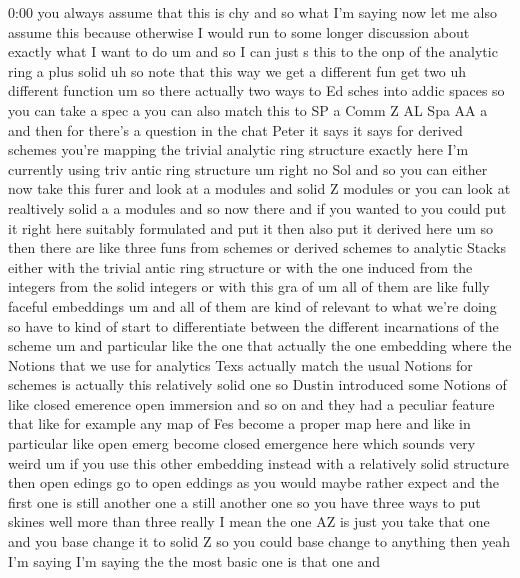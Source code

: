 \begin{unfinished}{0:00}
you  always  assume  that  this  is  chy  and
so  what  I'm  saying  now  let  me  also
assume  this  because  otherwise  I  would
run  to  some  longer  discussion  about
exactly  what  I  want  to  do
um  and  so  I  can  just  s  this  to  the  onp
of  the  analytic  ring  a  plus
solid  uh  so
note  that  this  way  we  get  a  different
fun
get  two  uh
different
function  um  so  there  actually  two  ways
to  Ed  sches  into  addic
spaces  so  you  can  take  a  spec
a  you  can  also  match  this  to
SP  a  Comm  Z  AL  Spa  AA
a  and  then  for  there's  a  question  in  the
chat  Peter  it  says  it  says  for  derived
schemes  you're  mapping  the  trivial
analytic  ring  structure  exactly  here  I'm
currently  using  triv  antic  ring
structure
um  right  no
Sol  and  so  you  can  either  now  take  this
furer  and  look  at  a  modules  and  solid  Z
modules  or  you  can  look  at  realtively
solid  a  a
modules  and  so  now  there  and  if  you
wanted  to  you
could  put  it  right  here  suitably
formulated  and  put  it  then  also  put  it
derived  here  um  so  then  there  are  like
three  funs  from  schemes  or  derived
schemes  to  analytic  Stacks  either  with
the  trivial  antic  ring  structure  or  with
the  one  induced  from  the  integers  from
the  solid  integers  or  with  this  gra
of  um  all  of  them  are  like  fully  faceful
embeddings  um
and  all  of  them  are  kind  of  relevant  to
what  we're  doing  so  have  to  kind  of
start  to  differentiate  between  the
different  incarnations  of  the  scheme
um  and  particular  like  the  one  that
actually  the  one  embedding  where  the
Notions  that  we  use  for  analytics  Texs
actually  match  the  usual  Notions  for
schemes  is  actually  this  relatively
solid  one  so  Dustin  introduced  some
Notions  of  like  closed  emerence  open
immersion  and  so  on  and  they  had  a
peculiar  feature
that  like  for  example  any  map  of  Fes
become  a  proper  map  here  and  like  in
particular  like  open  emerg  become  closed
emergence  here  which  sounds  very  weird
um  if  you  use  this  other  embedding
instead  with  a  relatively  solid
structure  then  open  edings  go  to  open
eddings  as  you  would  maybe  rather
expect  and  the  first  one  is  still
another  one  a  still  another  one  so  you
have  three  ways  to  put  skines  well  more
than  three  really  I  mean  the  one  AZ  is
just  you  take  that  one  and  you  base
change  it  to  solid  Z  so  you  could  base
change  to  anything
then  yeah  I'm
saying  I'm  saying
the  the  most  basic  one  is  that  one  and

\end{unfinished}
